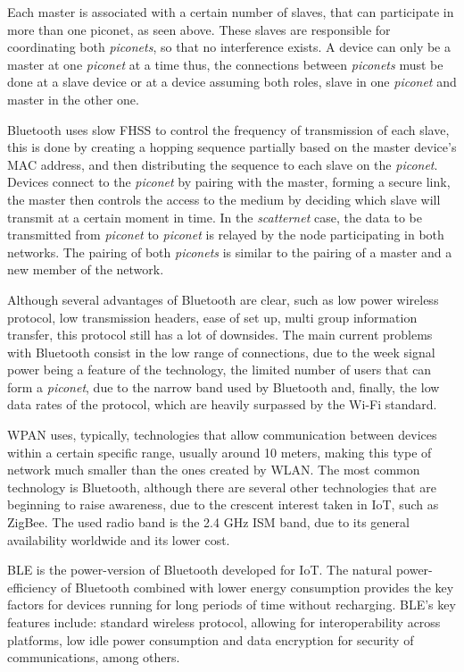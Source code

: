 Each master is associated with a certain number of slaves, that can participate in more than one piconet, as seen above. These slaves are responsible for coordinating both \textit{piconets}, so that no interference exists. A device can only be a master at one \textit{piconet} at a time thus, the connections between \textit{piconets} must be done at a slave device or at a device assuming both roles, slave in one \textit{piconet} and master in the other one.

Bluetooth uses slow \gls{FHSS} to control the frequency of transmission of each slave, this is done by creating a hopping sequence partially based on the master device's \gls{MAC} address, and then distributing the sequence to each slave on the \textit{piconet}. Devices connect to the \textit{piconet} by pairing with the master, forming a secure link, the master then controls the access to the medium by deciding which slave will transmit at a certain moment in time. In the \textit{scatternet} case, the data to be transmitted from \textit{piconet} to \textit{piconet} is relayed by the node participating in both networks. The pairing of both \textit{piconets} is similar to the pairing of a master and a new member of the network.

Although several advantages of Bluetooth are clear, such as low power wireless protocol, low transmission headers, ease of set up, multi group information transfer, this protocol still has a lot of downsides. The main current problems with Bluetooth consist in the low range of connections, due to the week signal power being a feature of the technology, the limited number of users that can form a \textit{piconet}, due to the narrow band used by Bluetooth and, finally, the low data rates of the protocol, which are heavily surpassed by the Wi-Fi standard.

\gls{WPAN} uses, typically, technologies that allow communication between devices within a certain specific range, usually around 10 meters, making this type of network much smaller than the ones created by \gls{WLAN}. The most common technology is Bluetooth, although there are several other technologies that are beginning to raise awareness, due to the crescent interest taken in \gls{IoT}, such as ZigBee. The used radio band is the 2.4 GHz \gls{ISM} band, due to its general availability worldwide and its lower cost.

\gls{BLE} is the power-version of Bluetooth developed for \gls{IoT}. The natural power-efficiency of Bluetooth combined with lower energy consumption provides the key factors for devices running for long periods of time without recharging. \gls{BLE}'s key features include: standard wireless protocol, allowing for interoperability across platforms, low idle power consumption and data encryption for security of communications, among others.

